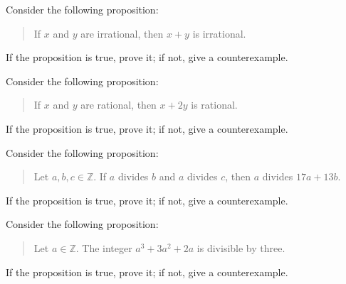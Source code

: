 \documentclass[12pt]{midterm}
\begin{document}
\begin{exam}
\begin{problem}[360]
  Consider the following proposition:
  \begin{quote}
    If $x$ and $y$ are irrational, then $x + y$ is irrational.
  \end{quote}
  If the proposition is true, prove it; if not, give a counterexample.
\end{problem}

\begin{solution}\begin{solutiontext}
\end{solutiontext}\end{solution}

\begin{problem}[360]
  Consider the following proposition:
  \begin{quote}
    If $x$ and $y$ are rational, then $x + 2y$ is rational.
  \end{quote}
  If the proposition is true, prove it; if not, give a counterexample.
\end{problem}

\begin{solution}\begin{solutiontext}
\end{solutiontext}\end{solution}

\begin{problem}[360]
  Consider the following proposition:
  \begin{quote}
    Let $a,b,c \in \mathbb{Z}$.  If $a$ divides $b$ and $a$ divides $c$, then $a$ divides $17a + 13b$.
  \end{quote}
  If the proposition is true, prove it; if not, give a counterexample.
\end{problem}

\begin{solution}\begin{solutiontext}
\end{solutiontext}\end{solution}

\begin{problem}[360]
  Consider the following proposition:
  \begin{quote}
    Let $a \in \mathbb{Z}$.  The integer $a^3+3 a^2+2 a$ is divisible by three.
  \end{quote}
  If the proposition is true, prove it; if not, give a counterexample.
\end{problem}


\end{exam}
\end{document}

